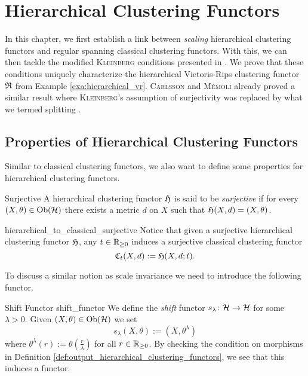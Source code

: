 \chapter{Hierarchical Clustering Functors}
\label{chapter__hierarchical}
In this chapter, we first establish a link between \emph{scaling} hierarchical clustering functors and regular spanning classical clustering functors.
%
With this, we can then tackle the modified \textsc{Kleinberg} conditions presented in \cite[Sec.~7.3.1]{Carlsson2010}.
We prove that these conditions uniquely characterize the hierarchical Vietoris-Rips clustering functor $\mathfrak{R}$ from Example \ref{exa:hierarchical_vr}. \textsc{Carlsson} and \textsc{M\'emoli} already proved a similar result where \textsc{Kleinberg}'s assumption of surjectivity was replaced by what we termed splitting \cite[Thm.~18]{JMLR:v11:carlsson10a}.


\section{Properties of Hierarchical Clustering Functors}

Similar to classical clustering functors, we also want to define some properties for hierarchical clustering functors.

\begin{definition}{Surjective}{}
A hierarchical clustering functor $\mathfrak{H}$ is said to be \emph{surjective} if for every ${(X, \theta) \in \mathrm {Ob}(\mathcal{H})}$ there exists a metric $d$ on $X$ such that $\mathfrak{H}(X,d) = (X, \theta)$.
\end{definition}

\begin{myremark}{}{hierarchical_to_classical_surjective}
Notice that given a surjective hierarchical clustering functor $\mathfrak{H}$, any $t \in \mathbb R_{\geq0}$ induces a surjective classical clustering functor
$$
\mathfrak{C}_t(X,d) := \mathfrak{H}(X, d; t).
$$
\end{myremark}


To discuss a similar notion as scale invariance we need to introduce the following functor.

\begin{definition}{Shift Functor \cite[Ex.~4.3]{Carlsson2010}}{shift_functor}
We define the \emph{shift} functor $s_\lambda\colon \mathcal{H} \to \mathcal{H}$ for some $\lambda > 0$. Given $(X, \theta) \in \mathrm {Ob}(\mathcal{H})$ we set
$$
s_\lambda(X, \theta) := (X, \theta^\lambda)
$$
where $\theta^\lambda(r) := \theta(\frac{r}{\lambda})$ for all $r \in \mathbb R_{\geq0}$.
By checking the condition on morphisms in Definition \ref{def:output_hierarchical_clustering_functors}, we see that this induces a functor.
\end{definition}

